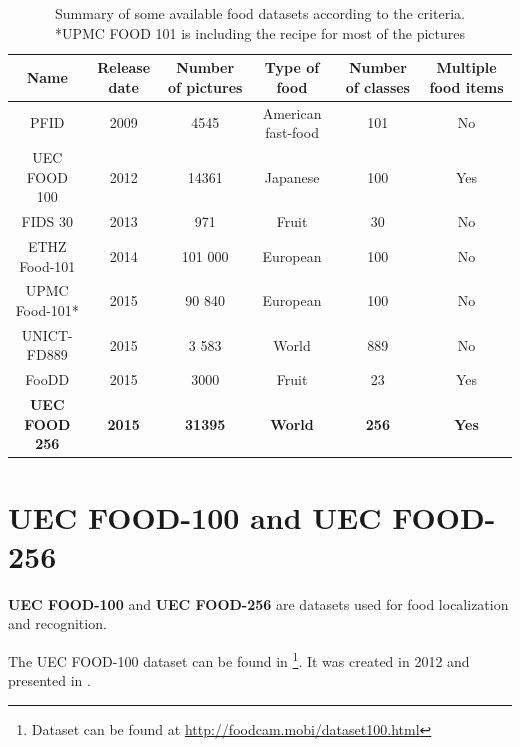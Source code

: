 \begin{table}
    \renewcommand{\arraystretch}{1.1} %
    \begin{tabulary}{\textwidth}{| c | C | C | C | C | C|}
        \hline
        Name & Release date & Number of pictures & Type of food & Number of classes & Multiple food items \\
        \hline
        PFID \cite{Chen2009} & 2009 & 4545 & American fast-food  & 101 & No \\
        \hline
        UEC FOOD 100 \cite{Matsuda2012a} & 2012 & 14361 & Japanese & 100  & Yes \\
        \hline
        FIDS 30 \cite{FIDS30} & 2013 & 971 & Fruit & 30 & No \\
        \hline
        ETHZ Food-101 \cite{Bossard2014} & 2014 & 101 000 & European & 100 & No \\
        \hline
        UPMC Food-101* \cite{Wang2015} & 2015 & 90 840 & European & 100 & No \\
        \hline
        UNICT-FD889 \cite{Farinella2015} & 2015 & 3 583 & World & 889 & No \\
        \hline
        FooDD \cite{ParisaPouladzadehAbdulsalamYassine2015} & 2015 & 3000 & Fruit & 23 & Yes \\
        \hline
        \textbf{UEC FOOD 256} \cite{Kawano2015} & \textbf{2015} & \textbf{31395} & \textbf{World} & \textbf{256}  & \textbf{Yes} \\ 
        \hline
    \end{tabulary}
    \caption[Summary of some available food datasets according to the criteria]{Summary of some available food datasets according to the criteria. \\
        *UPMC FOOD 101 is including the recipe for most of the pictures}
    \label{table:dataset_summary}
\end{table}

\section{UEC FOOD-100 and UEC FOOD-256}

\textbf{UEC FOOD-100} and \textbf{UEC FOOD-256} are datasets used for food localization and recognition.

The UEC FOOD-100 dataset can be found in \footnote{Dataset can be found at \url{http://foodcam.mobi/dataset100.html}}. It was created in 2012 and presented in \cite{Matsuda2012a}.

